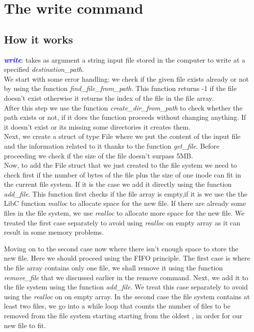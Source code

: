 \section{The write command}

\subsection{How it works}
\textit{\textcolor{blue}{\textbf{write}}}: takes as argument a string input file stored in the computer to write at a specified \textit{destination\_path}.\\

We start with some error handling: we check if the given file exists already or not  by using the function \textit{find\_file\_from\_path}. This function returns -1 if the file doesn't exist otherwise it returns the index of the file in the file array.\\

After this step we use the function \textit{create\_dir\_from\_path} to check whether the path exists or not, if it does the function proceeds without changing anything. If it doesn't exist or its missing some directories it creates them. \\

Next, we create a struct of type File where we put the content of the input file and the information related to it thanks to the function \textit{get\_file}. Before proceeding we check if the size of the file doesn't surpass 5MB.\\

Now, to add the File struct that we just created to the file system we need to check first if the number of bytes of the file plus the size of one inode can fit in the current file system. If it is the case we add it directly using the function \textit{add\_file}. This function first checks if the file array is empty,if it is we use the the LibC function \textit{malloc} to allocate space for the new file. If there are already some files in the file system, we use \textit{realloc} to allocate more space for the new file. We treated the first case separately to avoid using \textit{realloc} on empty array as it can result in some memory problems. \\
\newpage

Moving on to the second case now where there isn't enough space to store the new file. Here we should proceed using the FIFO principle.
The first case is where the file array contains only one file, we shall remove it using the function \textit{remove\_file} that we discussed earlier in the remove command. Next, we add it to the file system using  the function \textit{add\_file}. We treat this case separately to avoid using the \textit{realloc} on on empty array. In the second case the file system contains at least two files, we go into a while loop that counts the number of files to be removed from the file system starting starting from the oldest , in order for our new file to fit.\\

